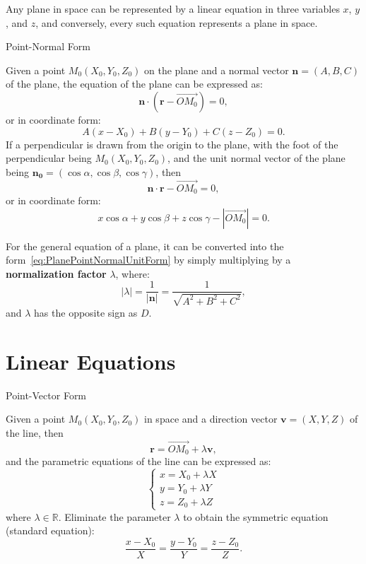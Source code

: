 \documentclass[11pt]{../../TexTemplate/elegantbook} %
\begin{document}
\begin{theorem}
    Any plane in space can be represented by a linear equation in three variables \(x\), \(y\), and \(z\), 
    and conversely, every such equation represents a plane in space.
\end{theorem}

\begin{leftbarTitle}{Point-Normal Form}\end{leftbarTitle}
Given a point \(M_{0}(X_{0}, Y_{0}, Z_{0})\) on the plane and a normal vector \(\mathbf{n} = (A, B, C)\) of the plane,
the equation of the plane can be expressed as:
\[
\mathbf{n} \cdot (\mathbf{r} - \vec{OM_{0}}) = 0,
\]
or in coordinate form:
\[
A(x - X_{0}) + B(y - Y_{0}) + C(z - Z_{0}) = 0.
\]
If a perpendicular is drawn from the origin to the plane, 
with the foot of the perpendicular being \(M_{0}(X_{0}, Y_{0}, Z_{0})\), 
and the unit normal vector of the plane being \(\mathbf{n_{0}} = (\cos \alpha, \cos \beta, \cos \gamma)\), then
\[
\mathbf{n} \cdot \mathbf{r} - \vec{OM_{0}} = 0,
\]
or in coordinate form:
\begin{equation}\label{eq:PlanePointNormalUnitForm}
    x \cos \alpha + y \cos \beta + z \cos \gamma - |\vec{OM_{0}}| = 0.    
\end{equation}

For the general equation of a plane, 
it can be converted into the form~\ref{eq:PlanePointNormalUnitForm} 
by simply multiplying by a \textbf{normalization factor} \(\lambda\), where:
\[
|\lambda| = \frac{1}{|\mathbf{n}|} = \frac{1}{\sqrt{A^2 + B^2 + C^2}},
\]
and \(\lambda\) has the opposite sign as \(D\).

\section{Linear Equations}
\begin{leftbarTitle}{Point-Vector Form}\end{leftbarTitle}
Given a point \(M_{0}(X_{0}, Y_{0}, Z_{0})\) in space and a direction vector \(\mathbf{v} = (X, Y, Z)\) of the line, 
then
\[
\mathbf{r} = \vec{OM_{0}} + \lambda \mathbf{v},
\]
and the parametric equations of the line can be expressed as:
\[
\begin{cases}
x = X_{0} + \lambda X \\
y = Y_{0} + \lambda Y \\
z = Z_{0} + \lambda Z
\end{cases}
\]
where \(\lambda \in \mathbb{R}\).
Eliminate the parameter \(\lambda\) to obtain the symmetric equation (standard equation):
\begin{equation}\label{eq:LineSymmetricForm}
    \frac{x - X_{0}}{X} = \frac{y - Y_{0}}{Y} = \frac{z - Z_{0}}{Z}.
\end{equation}
\end{document}
